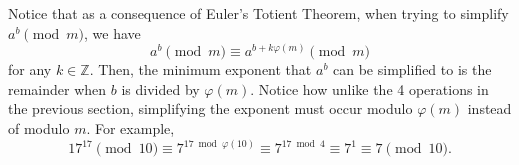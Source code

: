 \documentclass{article}
\newcommand{\Z}{\mathbb{Z}}
\newcommand{\p}{\varphi}
\newcommand{\al}{\alpha}
\begin{document}

Notice that as a consequence of Euler's Totient Theorem, when trying to simplify $a^b \pmod m$, we have \[a^b \pmod m \equiv a^{b + k\p(m)} \pmod m\] for any $k \in \Z$. Then, the minimum exponent that $a^b$ can be simplified to is the remainder when $b$ is divided by $\p(m)$. Notice how unlike the 4 operations in the previous section, simplifying the exponent must occur modulo $\p(m)$ instead of modulo $m$. For example, \[17^{17} \pmod{10} \equiv 7^{17 \bmod {\p(10)}} \equiv 7^{17 \bmod 4} \equiv 7^1 \equiv 7 \pmod{10}.\]
\end{document}
